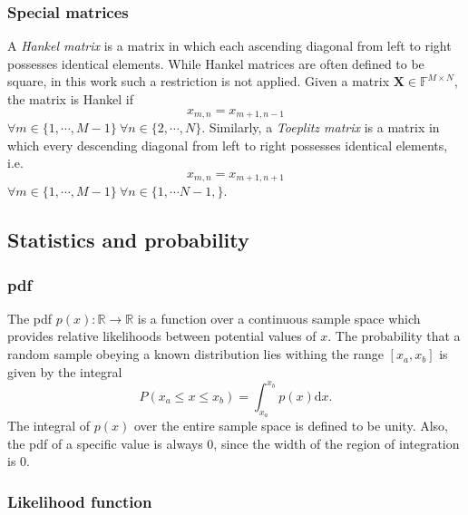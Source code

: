 \subsubsection{Special matrices}
A \emph{Hankel matrix} is a matrix in which each ascending diagonal from left to right
possesses identical elements. While Hankel matrices are often defined to be square, in
this work such a restriction is not applied. Given a matrix $\symbf{X} \in
\mathbb{F}^{M \times N}$, the matrix is Hankel if
\begin{equation}
    x_{m,n} = x_{m+1,n-1}
\end{equation}
$\forall m \in \lbrace 1, \cdots, M-1 \rbrace
\ \forall n \in \lbrace 2, \cdots, N \rbrace$.
Similarly, a \emph{Toeplitz matrix} is a matrix in which every descending
diagonal from left to right possesses identical elements, i.e.
\begin{equation}
    x_{m,n} = x_{m+1,n+1}
\end{equation}
$\forall m \in \lbrace 1, \cdots, M-1 \rbrace\ \forall n
\in \lbrace 1, \cdots N-1, \rbrace$.

\subsection{Statistics and probability}


\subsubsection{\Acl{pdf}}
The \ac{pdf} $p(x) : \mathbb{R} \rightarrow \mathbb{R}$ is a function over a
continuous sample space which provides relative likelihoods between potential
values of $x$.  The probability that a random sample obeying a known
distribution lies withing the range $[x_a, x_b]$ is given by the integral
\begin{equation}
    P(x_a \leq x \leq x_b) = \int_{x_a}^{x_b} p(x) \mathrm{d}x.
\end{equation}
The integral of $p(x)$ over the entire sample space is defined to be
unity. Also, the \ac{pdf} of a specific value is always $0$, since the width of
the region of integration is $0$.

\subsubsection{Likelihood function}

